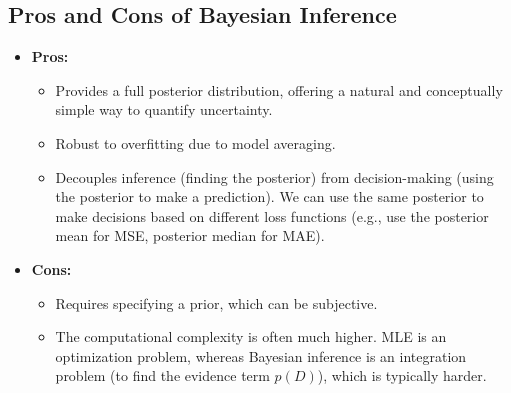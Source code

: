 \documentclass{article}
\begin{document}
\begin{multicols}{2}
\subsection{Pros and Cons of Bayesian Inference}
\begin{itemize}
    \item \textbf{Pros:}
    \begin{itemize}
        \item Provides a full posterior distribution, offering a natural and conceptually simple way to quantify uncertainty.
        \item Robust to overfitting due to model averaging.
        \item Decouples inference (finding the posterior) from decision-making (using the posterior to make a prediction). We can use the same posterior to make decisions based on different loss functions (e.g., use the posterior mean for MSE, posterior median for MAE).
    \end{itemize}
    \item \textbf{Cons:}
    \begin{itemize}
        \item Requires specifying a prior, which can be subjective.
        \item The computational complexity is often much higher. MLE is an optimization problem, whereas Bayesian inference is an integration problem (to find the evidence term $p(D)$), which is typically harder.
    \end{itemize}
\end{itemize}


\end{multicols}
\end{document}
